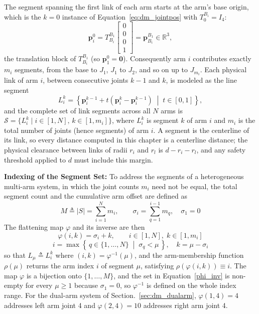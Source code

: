 The segment spanning the first link of each arm starts at the arm's base origin, which is the
$k=0$ instance of Equation~\eqref{eq:dm_jointpos} with $T^{B_i}_{0} = I_4$:
\begin{equation}
\mathbf{p}_i^{0} = T^{B_1}_{B_i}\begin{bmatrix} 0 \\ 0 \\ 0 \\ 1 \end{bmatrix} = \mathbf{p}^{B_1}_{B_i} \in \mathbb{R}^3,
\label{eq:dm_baseanchor}
\end{equation}
the translation block of $T^{B_1}_{B_i}$ (so $\mathbf{p}_1^0 = \mathbf{0}$). Consequently arm $i$
contributes exactly $m_i$ segments, from the base to $J_1$, $J_1$ to $J_2$, and so on up to
$J_{m_i}$. Each physical link of arm $i$, between consecutive joints $k-1$ and $k$, is modeled as
the line segment
\begin{equation}
L_i^k = \left\{ \mathbf{p}_i^{k-1} + t\left( \mathbf{p}_i^k - \mathbf{p}_i^{k-1} \right) \;\middle|\; t \in [0,1] \right\},
\label{eq:dm_segment}
\end{equation}
and the complete set of link segments across all $N$ arms is
$\mathcal{S} = \{ L_i^k \mid i \in [1,N],\, k \in [1,m_i] \}$, where $L_i^k$ is segment $k$ of arm $i$
and $m_i$ is the total number of joints (hence segments) of arm $i$. A segment is the centerline of
its link, so every distance computed in this chapter is a centerline distance; the physical clearance
between links of radii $r_i$ and $r_l$ is $d - r_i - r_l$, and any safety threshold applied to $d$
must include this margin.

\noindent\textbf{Indexing of the Segment Set:} To address the segments of a heterogeneous multi-arm system, in which the joint counts $m_i$ need not be equal, the total segment count and the cumulative arm offset are defined as
\begin{equation}
M \triangleq |{S}| = \sum_{i=1}^{N} m_i, \qquad
\sigma_i = \sum_{q=1}^{i-1} m_q, \quad \sigma_1 = 0
\label{seg_count}
\end{equation}
The flattening map $\varphi$ and its inverse are then
\begin{equation}
\varphi(i,k) = \sigma_i + k, \qquad i \in [1,N], \; k \in [1,m_i]
\label{phi_map}
\end{equation}
\begin{equation}
i = \max\left\{\, q \in \{1,\ldots,N\} \;\middle|\; \sigma_q < \mu \,\right\}, \quad k = \mu - \sigma_i
\label{phi_inv}
\end{equation}
so that $L_\mu \triangleq L_i^k$ where $(i,k) = \varphi^{-1}(\mu)$, and the arm-membership function $\rho(\mu)$ returns the arm index $i$ of segment $\mu$, satisfying $\rho(\varphi(i,k)) \equiv i$. The map $\varphi$ is a bijection onto $\{1,\ldots,M\}$, and the set in Equation~\eqref{phi_inv} is non-empty for every $\mu \geq 1$ because $\sigma_1 = 0$, so $\varphi^{-1}$ is defined on the whole index range. For the dual-arm system of Section.~\ref{sec:dm_dualarm}, $\varphi(1,4) = 4$ addresses left arm joint 4 and $\varphi(2,4) = 10$ addresses right arm joint 4.

